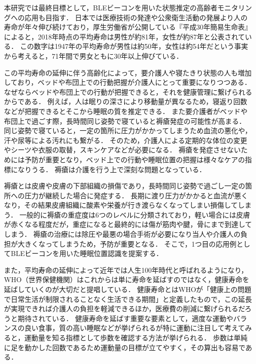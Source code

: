 本研究では最終目標として，BLEビーコンを用いた状態推定の高齢者モニタリングへの応用も目指す．
日本では医療技術の発達や公衆衛生活動の発展より人の寿命が年々伸び続けており，厚生労働省が公開している『平成30年簡易生命表』\cite{AveLife}によると，2018年時点の平均寿命は男性が約81年，女性が約87年と公表されている．
この数字は1947年の平均寿命が男性は約50年，女性は約54年だという事実から考えると，71年間で男女ともに30年以上伸びている．


この平均寿命の延伸に伴う高齢化によって，要介護人や寝たきり状態の人も増加しており，ベッドや布団上での行動把握が介護人にとって重要になりつつある．
なぜならベッドや布団上での行動が把握できると，それを健康管理に繋げられるからである．
例えば，人は眠りの深さにより移動量が異なるため，寝返り回数などが把握できるとそこから睡眠の質を推定できる．
また要介護者がベッドや布団上で過ごす際，長時間同じ姿勢で寝ていると褥瘡発症の可能性が高まる．
同じ姿勢で寝ていると，一定の箇所に圧力がかかってしまうため血流の悪化や，汗や尿等による汚れにも繋がる．
そのため，介護人による定期的な体位の変更やシーツや衣服の取替，スキンケアなどが必要になる\cite{jokusou, mekanizumu}．
褥瘡を発症させないためには予防が重要となり，ベッド上での行動や睡眠位置の把握は様々なケアの指標になりうる．
褥瘡は介護を行う上で深刻な問題となっている．

褥瘡とは皮膚や皮膚の下部組織の損傷であり，長時間同じ姿勢で過ごし一定の箇所への圧力が継続した場合に発症する．
長期に渡り圧力がかかると血流が悪くなり，その結果皮膚組織に酸素や栄養が行き渡らなくなってしまい損傷してしまう．
一般的に褥瘡の重症度は6つのレベルに分類\cite{level}されており，軽い場合には皮膚が赤くなる程度だが，重症になると最終的には傷が筋肉や腱，骨にまで到達してしまう．
褥瘡の治療には除圧や最悪の場合手術が必要になり当人や介護人の負担が大きくなってしまうため，予防が重要となる．
そこで，1つ目の応用例としてBLEビーコンを用いた睡眠位置認識を提案する．

また，平均寿命の延伸によって近年では人生100年時代と呼ばれるようになり，WHO（世界保健機関）はこれからは単に寿命を延ばすのではなく，健康寿命を延ばしていくのが大切だと提唱している．
健康寿命とはWHOが「健康上の問題で日常生活が制限されることなく生活できる期間」\cite{WHO}と定義したもので，この延長が実現できれば介護人の負担を軽減できるほか，医療費の削減に繋げられるだろうと期待されている．
健康寿命を延ばす重要な要素として，適度な運動やバランスの良い食事，質の高い睡眠などが挙げられるが特に運動に注目して考えてみると，運動量を知る指標として歩数を確認する方法が挙げられる．
歩数は単純に足を動かした回数であるため運動量の目標が立てやすく，その算出も容易である．


